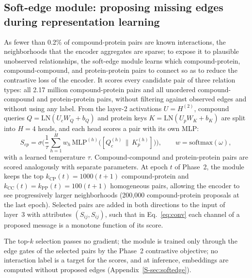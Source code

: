 \documentclass[10pt,letterpaper]{article}
\begin{document}
\subsection{Soft-edge module: proposing missing edges during representation learning}
\label{sec:softedge}
As fewer than 0.2\% of compound-protein pairs are known interactions, the neighborhoods that the encoder aggregates are sparse; to expose it to plausible unobserved relationships, the soft-edge module learns which compound-protein, compound-compound, and protein-protein pairs to connect so as to reduce the contrastive loss of the encoder. It scores every candidate pair of three relation types: all 2.17 million compound-protein pairs and all unordered compound-compound and protein-protein pairs, without filtering against observed edges and without using any label. From the layer-2 activations $U=H^{(2)}$, compound queries $Q=\mathrm{LN}(U_cW_Q+b_Q)$ and protein keys $K=\mathrm{LN}(U_pW_K+b_K)$ are split into $H=4$ heads, and each head scores a pair with its own MLP:
\begin{equation}
S_{cp} = \sigma\!\Big(\frac{1}{\tau}\sum_{h=1}^{H} w_h\, \mathrm{MLP}^{(h)}\big([Q_c^{(h)}\,\|\,K_p^{(h)}]\big)\Big),\qquad w=\mathrm{softmax}(\omega),
\label{eq:softedge}
\end{equation}
with a learned temperature $\tau$. Compound-compound and protein-protein pairs are scored analogously with separate parameters. At epoch $t$ of Phase~2, the module keeps the top $k_{\text{CP}}(t)=1000(t+1)$ compound-protein and $k_{\text{CC}}(t)=k_{\text{PP}}(t)=100(t+1)$ homogeneous pairs, allowing the encoder to see progressively larger neighborhoods (200,000 compound-protein proposals at the last epoch). Selected pairs are added in both directions to the input of layer~3 with attributes $(S_{ij},S_{ij})$, such that in Eq.~\eqref{eq:conv} each channel of a proposed message is a monotone function of its score.

The top-$k$ selection passes no gradient; the module is trained only through the edge gates of the selected pairs by the Phase~2 contrastive objective; no interaction label is a target for the scores, and at inference, embeddings are computed without proposed edges (Appendix~\ref{S-sec:softedge}).
\end{document}

